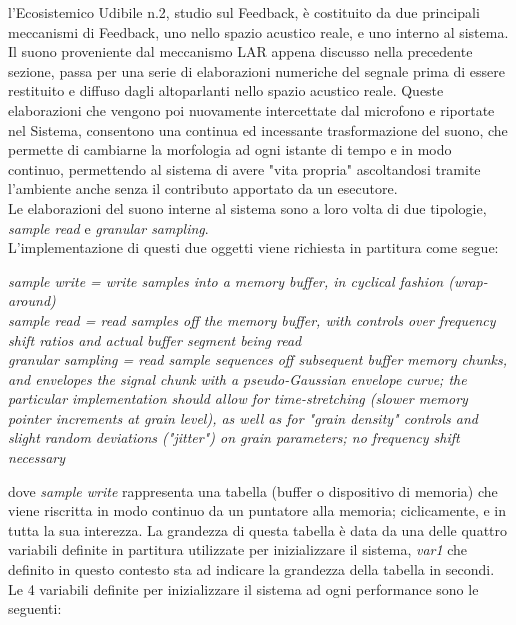 l’Ecosistemico Udibile n.2, studio sul Feedback, è costituito
da due principali meccanismi di Feedback, uno nello spazio acustico reale,
e uno interno al sistema. \\
Il suono proveniente dal meccanismo LAR appena discusso nella precedente sezione,
passa per una serie di elaborazioni numeriche del segnale prima di essere restituito
e diffuso dagli altoparlanti nello spazio acustico reale. Queste elaborazioni
che vengono poi nuovamente intercettate dal microfono e riportate nel Sistema,
consentono una continua ed incessante trasformazione del suono, che permette
di cambiarne la morfologia ad ogni istante di tempo e in modo continuo, 
permettendo al sistema di avere "vita propria" ascoltandosi tramite l'ambiente
anche senza il contributo apportato da un esecutore. \\
Le elaborazioni del suono interne al sistema sono a loro volta di due tipologie,
\textit{sample read} e \textit{granular sampling}. \\
L'implementazione di questi due oggetti viene richiesta in partitura come segue:

\begin{center}
    \vspace{0.5cm}
    \textit{sample write = write samples into a memory buffer, in cyclical fashion (wrap-around)} \\
    \textit{sample read = read samples off the memory buffer, with controls over frequency shift ratios and actual buffer segment being read} \\
    \textit{granular sampling = read sample sequences off subsequent buffer memory chunks, and envelopes the signal chunk with a pseudo-Gaussian envelope curve; the particular
    implementation should allow for time-stretching (slower memory pointer increments at grain level), as well as for "grain density" controls and slight random deviations ("jitter") on
    grain parameters; no frequency shift necessary} \\
    \vspace{0.5cm}
\end{center}

dove \textit{sample write} rappresenta una tabella (buffer o dispositivo di memoria) 
che viene riscritta in modo continuo da un puntatore alla memoria;
ciclicamente, e in tutta la sua interezza.
La grandezza di questa tabella è data da una delle quattro variabili definite 
in partitura utilizzate per inizializzare il sistema, \textit{var1} che definito in questo contesto sta ad indicare
la grandezza della tabella in secondi.
Le 4 variabili definite per inizializzare il sistema ad ogni performance sono le seguenti:

